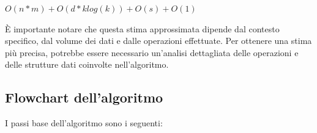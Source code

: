 \boldmath
\begin{center}
    \BlankLine
    $O(n * m) + O(d * k log(k)) + O(s) + O(1)$
    \BlankLine
\end{center}
\unboldmath


È importante notare che questa stima approssimata dipende dal contesto specifico, dal volume dei dati e dalle 
operazioni effettuate. Per ottenere una stima più precisa, potrebbe essere necessario un'analisi dettagliata 
delle operazioni e delle strutture dati coinvolte nell'algoritmo.


\newpage
\subsection{Flowchart dell'algoritmo}
I passi base dell'algoritmo sono i seguenti: 

